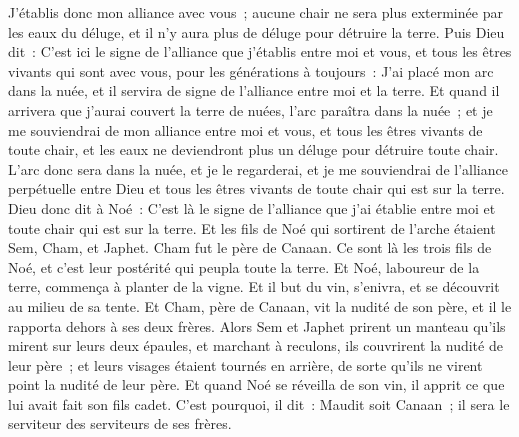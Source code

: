 \begin{multicols}{2}
J'établis donc mon alliance avec vous~; aucune chair ne sera plus exterminée par les eaux du déluge, et il n'y aura plus de déluge pour détruire la terre.
Puis Dieu dit~: C'est ici le signe de l'alliance que j'établis entre moi et vous, et tous les êtres vivants qui sont avec vous, pour les générations à toujours~:
J'ai placé mon arc dans la nuée, et il servira de signe de l'alliance entre moi et la terre.
Et quand il arrivera que j'aurai couvert la terre de nuées, l'arc paraîtra dans la nuée~;
et je me souviendrai de mon alliance entre moi et vous, et tous les êtres vivants de toute chair, et les eaux ne deviendront plus un déluge pour détruire toute chair.
L'arc donc sera dans la nuée, et je le regarderai, et je me souviendrai de l'alliance perpétuelle entre Dieu et tous les êtres vivants de toute chair qui est sur la terre.
Dieu donc dit à Noé~: C'est là le signe de l'alliance que j'ai établie entre moi et toute chair qui est sur la terre.
Et les fils de Noé qui sortirent de l'arche étaient Sem, Cham, et Japhet. Cham fut le père de Canaan.
Ce sont là les trois fils de Noé, et c'est leur postérité qui peupla toute la terre.
Et Noé, laboureur de la terre, commença à planter de la vigne.
Et il but du vin, s'enivra, et se découvrit au milieu de sa tente.
Et Cham, père de Canaan, vit la nudité de son père, et il le rapporta dehors à ses deux frères.
Alors Sem et Japhet prirent un manteau qu'ils mirent sur leurs deux épaules, et marchant à reculons, ils couvrirent la nudité de leur père~; et leurs visages étaient tournés en arrière, de sorte qu'ils ne virent point la nudité de leur père.
Et quand Noé se réveilla de son vin, il apprit ce que lui avait fait son fils cadet.
C'est pourquoi, il dit~: Maudit soit Canaan~; il sera le serviteur des serviteurs de ses frères.

\end{multicols}
